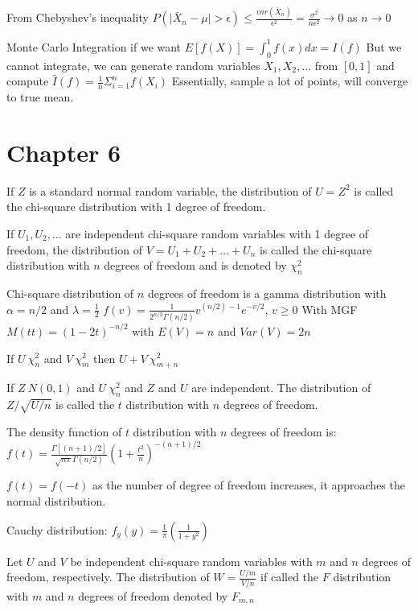 \documentclass{article}
\begin{document}
\begin{multicols*}{3}
    From Chebyshev's inequality
    $P\left( \vert \bar{X}_n - \mu\vert > \epsilon \right) \leq \frac{var \left(\bar{X}_n\right)}{\epsilon^2} = \frac{\sigma^2}{n \epsilon^2} \rightarrow 0$ as $n \rightarrow 0$

    Monte Carlo Integration
    if we want $E\left[f\left(X \right)\right] = \int_0^1 f\left( x \right) dx = I\left( f \right)$
    But we cannot integrate, we can generate random variables $X_1, X_2, \dots$ from $[0, 1]$ and compute $\hat{I}\left( f \right) = \frac{1}{n} \Sigma_{i=1}^n f\left(X_i\right)$
    Essentially, sample a lot of points, will converge to true mean.

    \section{Chapter 6}
    If $Z$ is a standard normal random variable, the distribution of $U=Z^2$ is called the chi-square distribution with 1 degree of freedom.

    If $U_1, U_2, \dots$ are independent chi-square random variables with 1 degree of freedom,
    the distribution of $V=U_1 +  U_2 + \dots + U_n$ is called the chi-square distribution
    with $n$ degrees of freedom and is denoted by $\chi_n^2$

    Chi-square distribution of $n$ degrees of freedom is a gamma distribution with $\alpha = n/2$ and $\lambda = \frac{1}{2}$
    $f\left( v \right) = \frac{1}{2^{n/2}\Gamma\left(n/2\right)} v^{\left(n/2\right)-1}e^{-v/2}$, $v \geq 0$
    With MGF $M\left( t t\right) = \left( 1-2t \right)^{-n/2}$ with $E\left(V\right)=n$ and $Var\left( V \right) = 2n$

    If $U ~\chi^2_n$ and $V~\chi^2_m$ then $U+V ~ \chi^2_{m+n}$

    If $Z~N(0, 1)$ and $U~\chi^2_n$ and $Z$ and $U$ are independent. The distribution of $Z/\sqrt{U/n}$ is called the $t$ distribution with $n$ degrees of freedom.

    The density function of $t$ distribution with $n$ degrees of freedom is:
    $f\left( t \right) = \frac{\Gamma\left[ \left( n+1 \right)/2 \right]}{\sqrt{n \pi} \Gamma\left(n/2\right)} \left( 1 + \frac{t^2 }{n}\right)^{-\left(n+1\right)/2}$

    $f(t) = f(-t)$ as the number of degree of freedom increases, it approaches the normal distribution.

    Cauchy distribution: $f_y(y) = \frac{1}{\pi} \left(\frac{1}{1 + y^2}\right)$

    Let $U$ and $V$ be independent chi-square random variables with $m$ and $n$ degrees of freedom, respectively.
    The distribution of $W = \frac{U/m}{V/n}$ if called the $F$ distribution with $m$ and $n$ degrees of freedom denoted by $F_{m,n}$


\end{multicols*}
\end{document}
